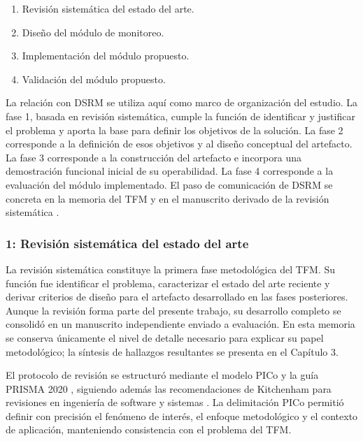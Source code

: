 \begin{enumerate}
  \item Revisión sistemática del estado del arte.
  \item Diseño del módulo de monitoreo.
  \item Implementación del módulo propuesto.
  \item Validación del módulo propuesto.
\end{enumerate}

La relación con DSRM se utiliza aquí como marco de organización del estudio. La fase 1, basada en revisión sistemática, cumple la función de identificar y justificar el problema y aporta la base para definir los objetivos de la solución. La fase 2 corresponde a la definición de esos objetivos y al diseño conceptual del artefacto. La fase 3 corresponde a la construcción del artefacto e incorpora una demostración funcional inicial de su operabilidad. La fase 4 corresponde a la evaluación del módulo implementado. El paso de comunicación de DSRM se concreta en la memoria del TFM y en el manuscrito derivado de la revisión sistemática \cite[pp.~51--56]{METDSRM01}.

\subsubsection{1: Revisión sistemática del estado del arte}

La revisión sistemática constituye la primera fase metodológica del TFM. Su función fue identificar el problema, caracterizar el estado del arte reciente y derivar criterios de diseño para el artefacto desarrollado en las fases posteriores. Aunque la revisión forma parte del presente trabajo, su desarrollo completo se consolidó en un manuscrito independiente enviado a evaluación. En esta memoria se conserva únicamente el nivel de detalle necesario para explicar su papel metodológico; la síntesis de hallazgos resultantes se presenta en el Capítulo 3.

El protocolo de revisión se estructuró mediante el modelo PICo y la guía PRISMA 2020 \cite{prisma2020}, siguiendo además las recomendaciones de Kitchenham para revisiones en ingeniería de software y sistemas \cite{kitchenham2007}. La delimitación PICo permitió definir con precisión el fenómeno de interés, el enfoque metodológico y el contexto de aplicación, manteniendo consistencia con el problema del TFM.




